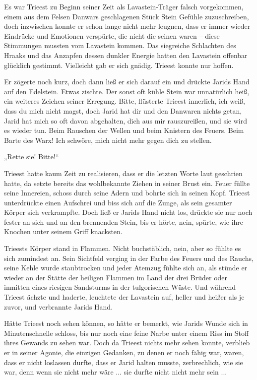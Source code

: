 Es war Trieest zu Beginn seiner Zeit als Lavastein-Träger falsch vorgekommen, einem aus dem Felsen Danwars geschlagenen Stück Stein Gefühle zuzuschreiben, doch inzwischen konnte er schon lange nicht mehr leugnen, dass er immer wieder Eindrücke und Emotionen verspürte, die nicht die seinen waren – diese Stimmungen mussten vom Lavastein kommen. Das siegreiche Schlachten des Hraaks und das Anzapfen dessen dunkler Energie hatten den Lavastein offenbar glücklich gestimmt. Vielleicht gab er sich gnädig. Trieest konnte nur hoffen.

Er zögerte noch kurz, doch dann ließ er sich darauf ein und drückte Jarids Hand auf den Edelstein. Etwas zischte. Der sonst oft kühle Stein war unnatürlich heiß, ein weiteres Zeichen seiner Erregung. Bitte, flüsterte Trieest innerlich, ich weiß, dass du mich nicht magst, doch Jarid hat dir und den Danwaren nichts getan, Jarid hat mich so oft davon abgehalten, dich aus mir rauszureißen, und sie wird es wieder tun. Beim Rauschen der Wellen und beim Knistern des Feuers. Beim Barte des Warx! Ich schwöre, mich nicht mehr gegen dich zu stellen.

„Rette sie! Bitte!“

Trieest hatte kaum Zeit zu realisieren, dass er die letzten Worte laut geschrien hatte, da setzte bereits das wohlbekannte Ziehen in seiner Brust ein. Feuer füllte seine Innereien, schoss durch seine Adern und bohrte sich in seinen Kopf. Trieest unterdrückte einen Aufschrei und biss sich auf die Zunge, als sein gesamter Körper sich verkrampfte. Doch ließ er Jarids Hand nicht los, drückte sie nur noch fester an sich und an den brennenden Stein, bis er hörte, nein, spürte, wie ihre Knochen unter seinem Griff knacksten.

Trieests Körper stand in Flammen. Nicht buchstäblich, nein, aber so fühlte es sich zumindest an. Sein Sichtfeld verging in der Farbe des Feuers und des Rauchs, seine Kehle wurde staubtrocken und jeder Atemzug fühlte sich an, als stünde er wieder an der Stätte der heiligen Flammen im Land der drei Brüder oder inmitten eines riesigen Sandsturms in der tulgorischen Wüste. Und während Trieest ächzte und haderte, leuchtete der Lavastein auf, heller und heißer als je zuvor, und verbrannte Jarids Hand.

Hätte Trieest noch sehen können, so hätte er bemerkt, wie Jarids Wunde sich in Minutenschnelle schloss, bis nur noch eine feine Narbe unter einem Riss im Stoff ihres Gewands zu sehen war. Doch da Trieest nichts mehr sehen konnte, verblieb er in seiner Agonie, die einzigen Gedanken, zu denen er noch fähig war, waren, dass er nicht loslassen durfte, dass er Jarid halten musste, zerbrechlich, wie sie war, denn wenn sie nicht mehr wäre ... sie durfte nicht nicht mehr sein ...

